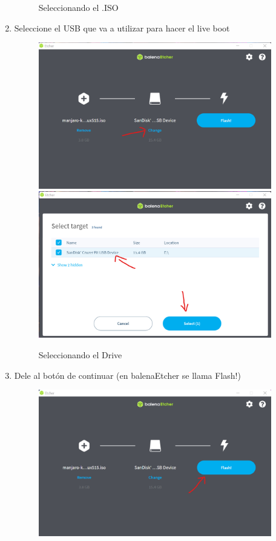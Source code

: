 \documentclass[stu, 12pt, letterpaper, donotrepeattitle, floatsintext, natbib, helv]{apa7}
\begin{document}
\begin{enumerate}
\begin{figure}[H]
        \caption{Seleccionando el .ISO}
        \label{fig:selectingISO}
    \end{figure}
    \item Seleccione el USB que va a utilizar para hacer el live boot
    \begin{figure}[H]
        \includegraphics[width = 0.96\textwidth]{SelectUSBDevice.png}
        \includegraphics[width = 0.96\textwidth]{SelectUSBDevice2.png}
        \caption{Seleccionando el Drive}
        \label{fig:selectingDrive}
    \end{figure}
    \item Dele al botón de continuar (en balenaEtcher se llama Flash!)
    \begin{figure}[H]
        \includegraphics[width = 0.96\textwidth]{Flash!.png}

\end{figure}
\end{enumerate}
\end{document}
